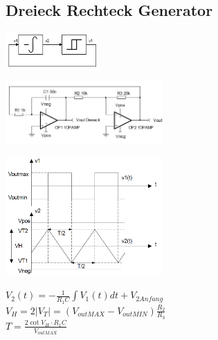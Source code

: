 \subsection{Dreieck Rechteck Generator}
	\begin{multicols}{3}
		\begin{center}
			\includegraphics[width=3.5cm]{bilder/osziDreieckRechteckBlock.png}\\
		\end{center}
		\includegraphics[width=6cm]{bilder/osziDreieckRechteck.png}
		\columnbreak
		
		\includegraphics[width=6cm]{bilder/osziDreieckRechteckSignal.png}
		\columnbreak
			
		$V_2\left(t\right)=-\frac{1}{R_1C}\int V_1\left(t\right)dt+V_{2 Anfang}$\\
		$V_H=2\left|V_T\right|=\left(V_{outMAX}-V_{outMIN}\right)\frac{R_2}{R_3}$\\
		$T=\frac{2\cot V_H \cdot R_1C}{V_{outMAX}}$\\
	\end{multicols}

